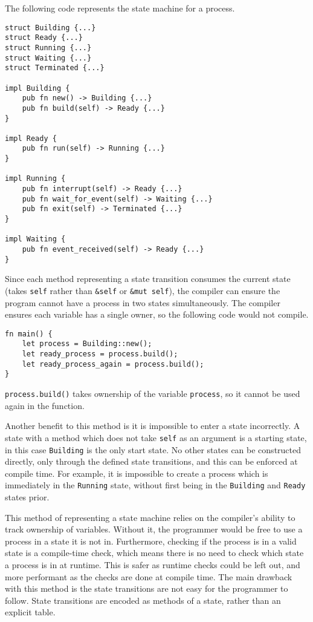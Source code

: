 \documentclass[]{article}
\begin{document}
The following code represents the state machine for a process.
\begin{lstlisting}
struct Building {...}
struct Ready {...}
struct Running {...}
struct Waiting {...}
struct Terminated {...}

impl Building {
	pub fn new() -> Building {...}
	pub fn build(self) -> Ready {...}
}

impl Ready {
	pub fn run(self) -> Running {...}
}

impl Running {
	pub fn interrupt(self) -> Ready {...}
	pub fn wait_for_event(self) -> Waiting {...}
	pub fn exit(self) -> Terminated {...}
}

impl Waiting {
	pub fn event_received(self) -> Ready {...}
}
\end{lstlisting}
Since each method representing a state transition consumes the current state
(takes \lstinline{self} rather than \lstinline{&self} or \lstinline{&mut self}),
the compiler can ensure the program cannot have a process in two states
simultaneously.
The compiler ensures each variable has a single owner, so the following code
would not compile.
\begin{lstlisting}
fn main() {
	let process = Building::new();
	let ready_process = process.build();
	let ready_process_again = process.build();
}
\end{lstlisting}
\lstinline{process.build()} takes ownership of the variable \lstinline{process},
so it cannot be used again in the function.

Another benefit to this method is it is impossible to enter a state incorrectly.
A state with a method which does not take \lstinline{self} as an argument is a
starting state, in this case \lstinline{Building} is the only start state.
No other states can be constructed directly, only through the defined state
transitions, and this can be enforced at compile time.
For example, it is impossible to create a process which is immediately in the
\lstinline{Running} state, without first being in the \lstinline{Building} and
\lstinline{Ready} states prior.

This method of representing a state machine relies on the compiler's ability to
track ownership of variables.
Without it, the programmer would be free to use a process in a state it is not
in.
Furthermore, checking if the process is in a valid state is a compile-time
check, which means there is no need to check which state a process is in at
runtime.
This is safer as runtime checks could be left out, and more performant as the
checks are done at compile time.
The main drawback with this method is the state transitions are not easy for
the programmer to follow.
State transitions are encoded as methods of a state, rather than an explicit
table.
\end{document}
